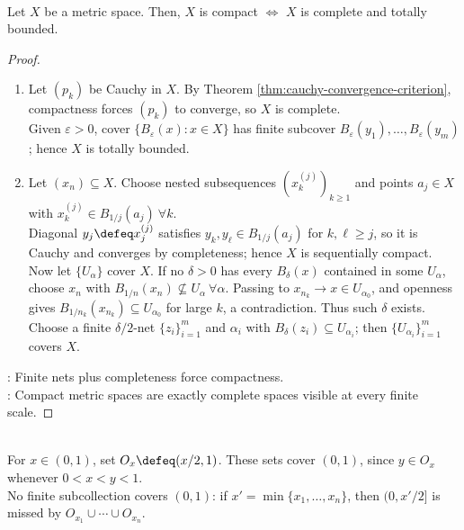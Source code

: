 \begin{theorem} \label{thm:compact-complete-totally-bounded} \\
Let $X$ be a metric space. Then, $X$ is compact $\Longleftrightarrow$ $X$ is complete and totally bounded.
\begin{proof}
\begin{enumerate}[label=\roman*.]
\setlength{\itemsep}{0pt}
\item[$(\Rightarrow)$] Let $(p_k)$ be Cauchy in $X$. By Theorem \ref{thm:cauchy-convergence-criterion}, compactness forces $(p_k)$ to converge, so $X$ is complete.\\
Given $\varepsilon>0$, cover $\{B_\varepsilon(x):x\in X\}$ has finite subcover $B_\varepsilon(y_1),\ldots,B_\varepsilon(y_m)$; hence $X$ is totally bounded.
\item[$(\Leftarrow)$] Let $(x_n)\subseteq X$. Choose nested subsequences $(x_k^{(j)})_{k\geq1}$ and points $a_j\in X$ with $x_k^{(j)}\in B_{1/j}(a_j) \ \forall k$.\\
Diagonal $y_j\defeq x_j^{(j)}$ satisfies $y_k,y_\ell\in B_{1/j}(a_j)$ for $k,\ell\geq j$, so it is Cauchy and converges by completeness; hence $X$ is sequentially compact. Now let $\{U_\alpha\}$ cover $X$. If no $\delta>0$ has every $B_\delta(x)$ contained in some $U_\alpha$, choose $x_n$ with $B_{1/n}(x_n)\nsubseteq U_\alpha \ \forall\alpha$. Passing to $x_{n_k}\to x\in U_{\alpha_0}$, and openness gives $B_{1/n_k}(x_{n_k})\subseteq U_{\alpha_0}$ for large $k$, a contradiction. Thus such $\delta$ exists.\\
Choose a finite $\delta/2$-net $\{z_i\}_{i=1}^m$ and $\alpha_i$ with $B_\delta(z_i)\subseteq U_{\alpha_i}$; then $\{U_{\alpha_i}\}_{i=1}^m$ covers $X$.
\end{enumerate}
: Finite nets plus completeness force compactness.\\
: Compact metric spaces are exactly complete spaces visible at every finite scale.
\end{proof}
\end{theorem}

\begin{example} \label{ex:open-interval-cover-without-finite-subcover} \\
For $x\in(0,1)$, set $O_x\defeq(x/2,1)$. These sets cover $(0,1)$, since $y\in O_x$ whenever $0<x<y<1$.\\
No finite subcollection covers $(0,1)$: if $x'=\min\{x_1,\ldots,x_n\}$, then $(0,x'/2]$ is missed by $O_{x_1}\cup\cdots\cup O_{x_n}$.
\end{example}

